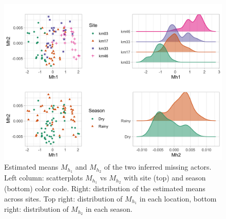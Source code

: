 \begin{figure}[h]
    \centering
    \includegraphics[width=12cm]{figs/Fatala_MH2.png}
    \caption{Estimated means $M_{h_1}$ and $M_{h_2}$ of the two inferred missing actors. Left column: scatterplots $M_{h_1}$ vs $M_{h_2}$ with site (top) and season (bottom) color code. Right: distribution of the estimated means across sites. Top right: distribution of $M_{h_1}$ in each location, bottom right: distribution of $M_{h_2}$ in each season.}
    \label{fig:Fatala}
\end{figure}


